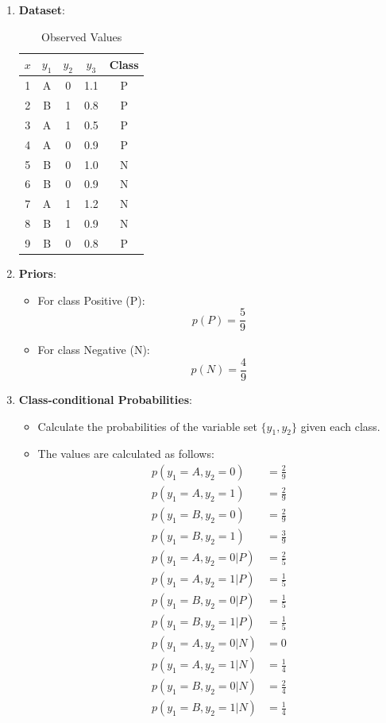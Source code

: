 \documentclass{article}
\begin{document}
\begin{enumerate}[leftmargin=\labelsep]
\begin{enumerate}
  \item \textbf{Dataset}:
  \begin{table}[h]
  \centering
  \begin{tabular}{ccccc}
  \toprule
  $x$ & $y_1$ & $y_2$ & $y_3$ & Class \\
  \midrule
  1 & A & 0 & 1.1 & P \\
  2 & B & 1 & 0.8 & P \\
  3 & A & 1 & 0.5 & P \\
  4 & A & 0 & 0.9 & P \\
  5 & B & 0 & 1.0 & N \\
  6 & B & 0 & 0.9 & N \\
  7 & A & 1 & 1.2 & N \\
  8 & B & 1 & 0.9 & N \\
  9 & B & 0 & 0.8 & P \\
  \bottomrule
  \end{tabular}
  \caption{Observed Values}
  \end{table}

  \item \textbf{Priors}:
  \begin{itemize}
      \item For class Positive (P):
      \[
      p(P) = \frac{5}{9}
      \]
      \item For class Negative (N):
      \[
      p(N) = \frac{4}{9}
      \]
  \end{itemize}

  \item \textbf{Class-conditional Probabilities}:
  \begin{itemize}
      \item Calculate the probabilities of the variable set \(\{y_1, y_2\}\) given each class.
      \item The values are calculated as follows:
      \begin{align*}
        p(y_1 = A, y_2 = 0) &= \frac{2}{9} \\
        p(y_1 = A, y_2 = 1) &= \frac{2}{9} \\
        p(y_1 = B, y_2 = 0) &= \frac{2}{9} \\
        p(y_1 = B, y_2 = 1) &= \frac{3}{9} \\
        p(y_1 = A, y_2 = 0 | P) &= \frac{2}{5} \\
        p(y_1 = A, y_2 = 1 | P) &= \frac{1}{5} \\
        p(y_1 = B, y_2 = 0 | P) &= \frac{1}{5} \\
        p(y_1 = B, y_2 = 1 | P) &= \frac{1}{5} \\
        p(y_1 = A, y_2 = 0 | N) &= 0 \\
        p(y_1 = A, y_2 = 1 | N) &= \frac{1}{4} \\
        p(y_1 = B, y_2 = 0 | N) &= \frac{2}{4} \\
        p(y_1 = B, y_2 = 1 | N) &= \frac{1}{4}
      \end{align*}
  \end{itemize}


\end{enumerate}
\end{enumerate}
\end{document}
